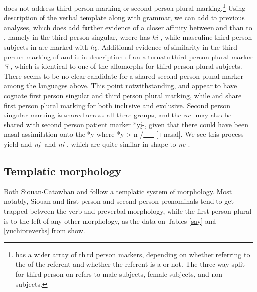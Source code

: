 \documentclass[output=paper]{LSP/langsci}
\begin{document}
\citet{Rankin1998scy} does not address third person marking or second person plural marking.\footnote{ has a wider array of third person markers, depending on whether referring to the  of the referent and whether the referent is a  or not. The three-way split for third person on  refers to male  subjects, female  subjects, and non- subjects.} Using  description of the  verbal template along with   grammar, we can add to previous analyses, which does add further evidence of a closer affinity between  and  than to , namely in the third person singular, where  has \emph{hi-}, while masculine third person subjects in  are marked with \emph{h\k{e}}. Additional evidence of similarity in the third person marking of  and  is in  description of an alternate third person plural marker \emph{'i}-, which is identical to one of the  allomorphs for third person plural subjects. There seems to be no clear candidate for a shared second person plural marker among the languages above. This point notwithstanding,  and  appear to have cognate first person singular and third person plural marking, while  and  share first person plural marking for both inclusive and exclusive. Second person singular marking is shared across all three groups, and the  \emph{ne-} may also be shared with  second person patient marker *y\k{i}-, given that there could have been nasal assimilation onto the *y where *y > n /\underline{~~~} [+nasal]. We see this process yield  and  \emph{n\k{i}}- and  \emph{ni-}, which are quite similar in shape to  \emph{ne-}.

\subsection{Templatic morphology}

Both Siouan-Catawban and  follow a templatic system of morphology. Most notably, Siouan and  first-person and second-person pronominals tend to get trapped between the verb and preverbal morphology, while the first person plural is to the left of any other morphology, as the data on Tables \ref{say} and \ref{yuchipreverbs} from \citet{Rankin1998scy} show.
\end{document}
